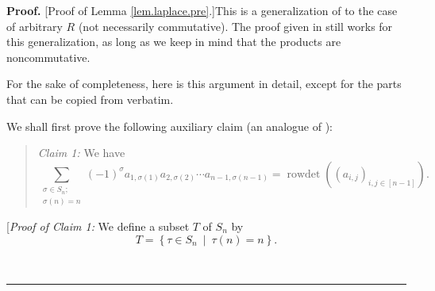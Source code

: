 \documentclass
[numbers=enddot,12pt,final,onecolumn,notitlepage,english]{scrartcl}%
\theoremstyle{definition}
\newenvironment{statement}{\begin{quote}}{\end{quote}}
\newenvironment{proof}[1][Proof]{\noindent\textbf{#1.} }{\ \rule{0.5em}{0.5em}}
\let\sumnonlimits\sum
\renewcommand{\sum}{\sumnonlimits\limits}
\newenvironment{verlong}{}{}
\begin{document}
\begin{verlong}
\begin{proof}
[Proof of Lemma \ref{lem.laplace.pre}.]This is a generalization of
\cite[Theorem 6.43]{detnotes} to the case of arbitrary $R$ (not necessarily
commutative). The proof given in \cite{detnotes} still works for this
generalization, as long as we keep in mind that the products are noncommutative.

For the sake of completeness, here is this argument in detail, except for the
parts that can be copied from \cite[proof of Theorem 6.43]{detnotes} verbatim.

We shall first prove the following auxiliary claim (an analogue of \cite[Lemma
6.44]{detnotes}):

\begin{statement}
\textit{Claim 1:} We have
\[
\sum_{\substack{\sigma\in S_{n};\\\sigma\left(  n\right)  =n}}\left(
-1\right)  ^{\sigma}a_{1,\sigma\left(  1\right)  }a_{2,\sigma\left(  2\right)
}\cdots a_{n-1,\sigma\left(  n-1\right)  }=\operatorname*{rowdet}\left(
\left(  a_{i,j}\right)  _{i,j\in\left[  n-1\right]  }\right)  .
\]

\end{statement}

[\textit{Proof of Claim 1:} We define a subset $T$ of $S_{n}$ by%
\[
T=\left\{  \tau\in S_{n}\ \mid\ \tau\left(  n\right)  =n\right\}  .
\]



\end{proof}
\end{verlong}
\end{document}
